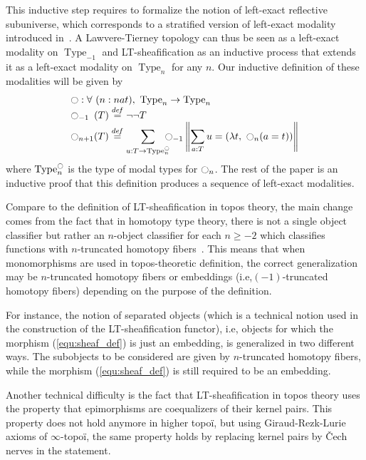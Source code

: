 \documentclass[preprint,9pt,numbers]{sigplanconf}
\newcommand \defeq {\overset{de\hspace{-0.2ex}f}{=}}
\newcommand{\ie}{i.e,\xspace}
\DeclareMathOperator{\Type}{Type}
\newcommand{\modal}{\ensuremath{\ocircle}}
\begin{document}
This inductive step requires to formalize the notion of left-exact
reflective subuniverse, which corresponds to a stratified version of
left-exact modality introduced in~\cite[Chapter~7]{hottbook}. A
Lawvere-Tierney topology can thus be seen as a left-exact modality on
$\Type_{-1}$ and LT-sheafification as an inductive process that extends
it as a left-exact modality on $\Type_{n}$ for any $n$.
Our inductive definition of these modalities will be given by
\[ \begin{array}{l}
   \modal : \forall \ (n : nat), \ \Type_n \to \Type_n 
   \\
    \modal_{-1\phantom{n}}(T) \defeq\lnot\lnot T \\

      \displaystyle{\modal_{n+1}(T)} \defeq  
      \displaystyle{\sum_{u:T \to \Type_n^\modal} \!\!\!\!\modal_{-1} 
      \left\|
      \sum_{a:T} u= (\lambda t,~\modal_n (a=t))
      \right\|}
    \end{array}
\]
where $\Type_n^\modal$ is the type of modal types for $\modal_n$.
The rest of the paper is an inductive proof that this definition produces a
sequence of left-exact modalities.

Compare to the definition of LT-sheafification in topos theory, the main
change comes from the fact that in homotopy type theory, there is not
a single object classifier but rather an $n$-object classifier for
each $n\geq -2$ which classifies functions with $n$-truncated homotopy
fibers~\cite{sets_in_hott}. This means that when monomorphisms are used in topos-theoretic definition, the correct generalization may be $n$-truncated homotopy
fibers or embeddings (\ie $(-1)$-truncated homotopy
fibers) depending on the purpose of the definition.

For instance, the notion of separated objects (which is a technical
notion used in the construction of the LT-sheafification functor), \ie
objects for which the morphism
(\ref{equ:sheaf_def}) is just an embedding, is generalized in two
different ways.  
%
The subobjects to be considered are given by $n$-truncated homotopy fibers,
while the morphism (\ref{equ:sheaf_def}) is still required to be an
embedding.

Another technical difficulty is the fact that LT-sheafification in topos
theory uses the property that epimorphisms are coequalizers of their
kernel pairs. This property does not hold anymore in higher topoï, but
using Giraud-Rezk-Lurie axioms of $\infty$-topoï, the same property
holds by replacing kernel pairs by \v{C}ech nerves in the statement.
\end{document}
